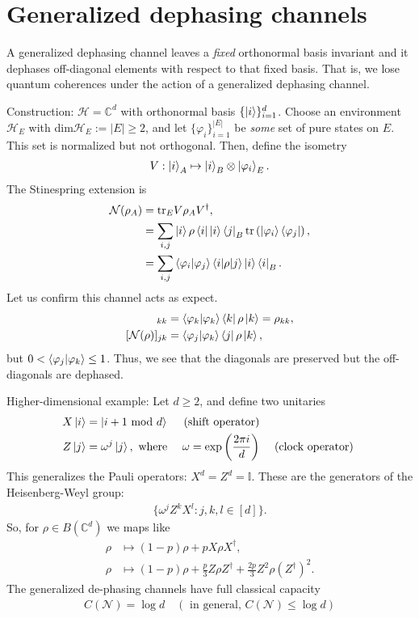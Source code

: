 \documentclass[10pt,oneside,longbibliography]{report}
\begin{document}
\section{Generalized dephasing channels}
A generalized dephasing channel leaves a \textit{fixed} orthonormal basis invariant and it dephases off-diagonal elements with respect to that fixed basis. That is, we lose quantum coherences under the action of a generalized dephasing channel. 

Construction: $\mathcal{H}=\mathbb{C}^d$ with orthonormal basis $\{\ket{i}\}_{i=1}^d$. Choose an environment $\mathcal{H}_E$ with dim$\mathcal{H}_E :=|E| \geq 2$, and let $\{\varphi_i\}_{i=1}^{|E|}$ be \textit{some} set of pure states on $E$. This set is normalized but not orthogonal. Then, define the isometry
\begin{align}
   V: \ket{i}_A \mapsto \ket{i}_B \otimes \ket{\varphi_i}_E.
\end{align}
The Stinespring extension is
\begin{align}
    \mathcal{N}(\rho_A) &= \text{tr}_E V \rho_A V^{\dagger}, \\
    &= \sum_{i,j} \ket{i}\rho \bra{i} \ket{i}\bra{j}_B \text{tr}\left(\ket{\varphi_i}\bra{\varphi_j}\right),\\
    &=\sum_{i,j} \braket{\varphi_i|\varphi_j} \braket{i|\rho|j} \ket{i}\bra{i}_B.
\end{align}
Let us confirm this channel acts as expect. 
\begin{align}
    [\mathcal{N}(\rho)]_{kk} &= \braket{\varphi_k|\varphi_k} \bra{k}\rho \ket{k} = \rho_{kk}, \\
    [\mathcal{N}(\rho)]_{jk} &=\braket{\varphi_j|\varphi_k} \bra{j}\rho \ket{k},
\end{align}
but $0 < \braket{\varphi_j|\varphi_k} \leq 1$. Thus, we see that the diagonals are preserved but the off-diagonals are dephased. 

Higher-dimensional example: Let $d\geq 2$, and define two unitaries 
\begin{align}
    X\ket{i} &= \ket{i+1 \text{ mod } d} \quad \text{ (shift operator) } \\
    Z\ket{j} &= \omega^j \ket{j}, \text{ where } \quad \omega=\exp{\left(\frac{2 \pi i}{d}\right)} \quad \text{ (clock operator) }
\end{align}
This generalizes the Pauli operators: $X^d=Z^d = \mathbb{I}$. These are the generators of the Heisenberg-Weyl group:
\begin{align}
    \{\omega^j Z^k X^l : j,k,l \in [d]\}.
\end{align}
So, for $\rho \in B(\mathbb{C}^d)$ we maps like 
\begin{align}
    \rho &\mapsto (1-p)\rho + p X\rho X^{\dagger}, \\
    \rho &\mapsto (1-p)\rho +\frac{p}{3} Z\rho Z^{\dagger} + \frac{2p}{3} Z^2 \rho (Z^{\dagger})^2.
\end{align}
The generalized de-phasing channels have full classical capacity 
\begin{align}
    C(\mathcal{N})=\log{d} \quad (\text{ in general, } C(\mathcal{N})\leq \log{d})
\end{align}
\end{document}
